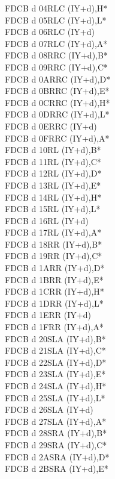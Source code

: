 \documentclass[oneside,a4paper]{book}
\begin{document}
\begin{multicols}{3}
{\begin{tabbing}
FDCB d 04\>RLC (IY+d),H*\\
FDCB d 05\>RLC (IY+d),L*\\
FDCB d 06\>RLC (IY+d)\\
FDCB d 07\>RLC (IY+d),A*\\
FDCB d 08\>RRC (IY+d),B*\\
FDCB d 09\>RRC (IY+d),C*\\
FDCB d 0A\>RRC (IY+d),D*\\
FDCB d 0B\>RRC (IY+d),E*\\
FDCB d 0C\>RRC (IY+d),H*\\
FDCB d 0D\>RRC (IY+d),L*\\
FDCB d 0E\>RRC (IY+d)\\
FDCB d 0F\>RRC (IY+d),A*\\
FDCB d 10\>RL (IY+d),B*\\
FDCB d 11\>RL (IY+d),C*\\
FDCB d 12\>RL (IY+d),D*\\
FDCB d 13\>RL (IY+d),E*\\
FDCB d 14\>RL (IY+d),H*\\
FDCB d 15\>RL (IY+d),L*\\
FDCB d 16\>RL (IY+d)\\
FDCB d 17\>RL (IY+d),A*\\
FDCB d 18\>RR (IY+d),B*\\
FDCB d 19\>RR (IY+d),C*\\
FDCB d 1A\>RR (IY+d),D*\\
FDCB d 1B\>RR (IY+d),E*\\
FDCB d 1C\>RR (IY+d),H*\\
FDCB d 1D\>RR (IY+d),L*\\
FDCB d 1E\>RR (IY+d)\\
FDCB d 1F\>RR (IY+d),A*\\
FDCB d 20\>SLA (IY+d),B*\\
FDCB d 21\>SLA (IY+d),C*\\
FDCB d 22\>SLA (IY+d),D*\\
FDCB d 23\>SLA (IY+d),E*\\
FDCB d 24\>SLA (IY+d),H*\\
FDCB d 25\>SLA (IY+d),L*\\
FDCB d 26\>SLA (IY+d)\\
FDCB d 27\>SLA (IY+d),A*\\
FDCB d 28\>SRA (IY+d),B*\\
FDCB d 29\>SRA (IY+d),C*\\
FDCB d 2A\>SRA (IY+d),D*\\
FDCB d 2B\>SRA (IY+d),E*\\

\end{tabbing}}
\end{multicols}
\end{document}
